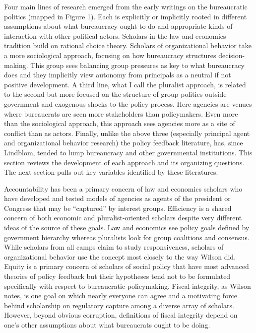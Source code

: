 Four main lines of research emerged from the early writings on the bureaucratic politics (mapped in Figure 1). Each is explicitly or implicitly rooted in different assumptions about what bureaucracy ought to do and appropriate kinds of interaction with other political actors. Scholars in the law and economics tradition build on rational choice theory. Scholars of organizational behavior take a more sociological approach, focusing on how bureaucracy structures decision-making. This group sees balancing group pressures as key to what bureaucracy does and they implicitly view autonomy from principals as a neutral if not positive development. A third line, what I call the pluralist approach, is related to the second but more focused on the structure of group politics outside government and exogenous shocks to the policy process. Here agencies are venues where bureaucrats are seen more stakeholders than policymakers. Even more than the sociological approach, this approach sees agencies more as a site of conflict than as actors. Finally, unlike the above three (especially principal agent and organizational behavior research) the policy feedback literature, has, since Lindblom, tended to lump bureaucracy and other governmental institutions. This section reviews the development of each approach and its organizing questions. The next section pulls out key variables identified by these literatures. 

Accountability has been a primary concern of law and economics scholars who have developed and tested models of agencies as agents of the president or Congress that may be ``captured'' by interest groups. Efficiency is a shared concern of both economic and pluralist-oriented scholars despite very different ideas of the source of these goals. Law and economics see policy goals defined by government hierarchy whereas pluralists look for group coalitions and consensus.  While scholars from all camps claim to study responsiveness, scholars of organizational behavior use the concept most closely to the way Wilson did. Equity is a primary concern of scholars of social policy that have most advanced theories of policy feedback but their hypotheses tend not to be formulated specifically with respect to bureaucratic policymaking. Fiscal integrity, as Wilson notes, is one goal on which nearly everyone can agree and a motivating force behind scholarship on regulatory capture among a diverse array of scholars. However, beyond obvious corruption, definitions of fiscal integrity depend on one's other assumptions about what bureaucrats ought to be doing. 

